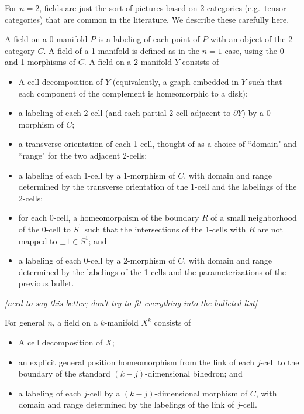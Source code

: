 \documentclass[11pt,leqno]{amsart}
\def\bd{\partial}
\def\nn#1{{{\it \small [#1]}}}
\begin{document}
For $n=2$, fields are just the sort of pictures based on 2-categories (e.g.\ tensor categories)
that are common in the literature.
We describe these carefully here.

A field on a 0-manifold $P$ is a labeling of each point of $P$ with
an object of the 2-category $C$.
A field of a 1-manifold is defined as in the $n=1$ case, using the 0- and 1-morphisms of $C$.
A field on a 2-manifold $Y$ consists of
\begin{itemize}
    \item A cell decomposition of $Y$ (equivalently, a graph embedded in $Y$ such
that each component of the complement is homeomorphic to a disk);
    \item a labeling of each 2-cell (and each partial 2-cell adjacent to $\bd Y$)
by a 0-morphism of $C$;
    \item a transverse orientation of each 1-cell, thought of as a choice of
``domain" and ``range" for the two adjacent 2-cells;
    \item a labeling of each 1-cell by a 1-morphism of $C$, with
domain and range determined by the transverse orientation of the 1-cell
and the labelings of the 2-cells;
    \item for each 0-cell, a homeomorphism of the boundary $R$ of a small neighborhood
of the 0-cell to $S^1$ such that the intersections of the 1-cells with $R$ are not mapped
to $\pm 1 \in S^1$; and
    \item a labeling of each 0-cell by a 2-morphism of $C$, with domain and range
determined by the labelings of the 1-cells and the parameterizations of the previous
bullet.
\end{itemize}
\nn{need to say this better; don't try to fit everything into the bulleted list}

For general $n$, a field on a $k$-manifold $X^k$ consists of
\begin{itemize}
    \item A cell decomposition of $X$;
    \item an explicit general position homeomorphism from the link of each $j$-cell
to the boundary of the standard $(k-j)$-dimensional bihedron; and
    \item a labeling of each $j$-cell by a $(k-j)$-dimensional morphism of $C$, with
domain and range determined by the labelings of the link of $j$-cell.
\end{itemize}

\end{document}
